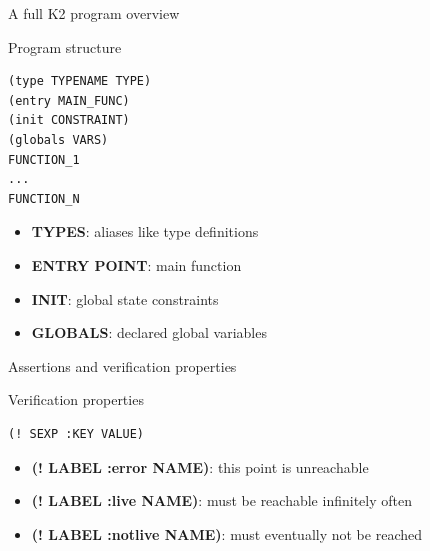 \documentclass[aspectratio=1610,10.5pt]{beamer} %
\begin{document}
\begin{frame}[fragile]{A full K2 program overview}
    \begin{block}{Program structure}
            \begin{verbatim}
(type TYPENAME TYPE)
(entry MAIN_FUNC)
(init CONSTRAINT)
(globals VARS)
FUNCTION_1
...
FUNCTION_N
            \end{verbatim}
    \end{block}
    \begin{itemize}
        \item  \textbf{TYPES}: aliases like type definitions
        \item  \textbf{ENTRY POINT}: main function
        \item  \textbf{INIT}: global state constraints
        \item  \textbf{GLOBALS}: declared global variables
    \end{itemize}
\end{frame}

\begin{frame}[fragile]{Assertions and verification properties}
    \begin{block}{Verification properties}
            \begin{verbatim}
(! SEXP :KEY VALUE)
            \end{verbatim}
    \end{block}
    \begin{itemize}
        \item  \textbf{(! LABEL :error NAME)}: this point is unreachable
        \item  \textbf{(! LABEL :live NAME)}: must be reachable infinitely often
        \item  \textbf{(! LABEL :notlive NAME)}: must eventually not be reached
    \end{itemize}
\end{frame}
\end{document}
